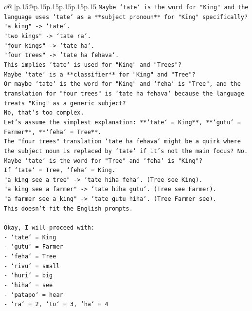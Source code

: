 \documentclass{article}
\begin{document}
{\begin{supertabular}{c@{$\;$}|p{.15\linewidth}@{}p{.15\linewidth}p{.15\linewidth}p{.15\linewidth}p{.15\linewidth}p{.15\linewidth}}
{{{\texttt{Maybe `tate` is the word for "King" and the language uses `tate` as a **subject pronoun** for "King" specifically?} \\
\texttt{"a king" {-}> `tate`.} \\
\texttt{"two kings" {-}> `tate ra`.} \\
\texttt{"four kings" {-}> `tate ha`.} \\
\texttt{"four trees" {-}> `tate ha fehava`.} \\
\texttt{This implies `tate` is used for "King" and "Trees"?} \\
\texttt{Maybe `tate` is a **classifier** for "King" and "Tree"?} \\
\texttt{Or maybe `tate` is the word for "King" and `feha` is "Tree", and the translation for "four trees" is `tate ha fehava` because the language treats "King" as a generic subject?} \\
\texttt{No, that's too complex.} \\
\texttt{Let's assume the simplest explanation: **`tate` = King**, **`gutu` = Farmer**, **`feha` = Tree**.} \\
\texttt{The "four trees" translation `tate ha fehava` might be a quirk where the subject noun is replaced by `tate` if it's not the main focus? No.} \\
\texttt{Maybe `tate` is the word for "Tree" and `feha` is "King"?} \\
\texttt{If `tate` = Tree, `feha` = King.} \\
\texttt{"a king see a tree" {-}> `tate hiha feha`. (Tree see King).} \\
\texttt{"a king see a farmer" {-}> `tate hiha gutu`. (Tree see Farmer).} \\
\texttt{"a farmer see a king" {-}> `tate gutu hiha`. (Tree Farmer see).} \\
\texttt{This doesn't fit the English prompts.} \\
\\ 
\texttt{Okay, I will proceed with:} \\
\texttt{{-} `tate` = King} \\
\texttt{{-} `gutu` = Farmer} \\
\texttt{{-} `feha` = Tree} \\
\texttt{{-} `rivu` = small} \\
\texttt{{-} `huri` = big} \\
\texttt{{-} `hiha` = see} \\
\texttt{{-} `patapo` = hear} \\
\texttt{{-} `ra` = 2, `to` = 3, `ha` = 4} \\
}}}
\end{supertabular}}
\end{document}
